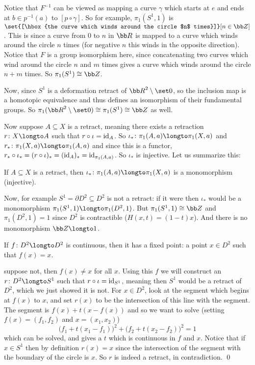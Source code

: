 Notice that $F^{-1}$ can be viewed as mapping a curve $\gamma$ which starts at $e$ and ends at $b\in p^{-1}(a)$ to $[p\circ\gamma]$.
So for example, $\pi_1(S^1,1)$ is $\set{[\hbox{the curve which winds around the circle $n$ times}]}[n\in{\bb Z}]$.
This is since a curve from $0$ to $n$ in ${\bb R}$ is mapped to a curve which winds around the circle $n$ times (for negative $n$ this winds in the opposite direction).
Notice that $F$ is a group isomorphism here, since concatenating two curves which wind around the circle $n$ and $m$ times gives a curve which winds around the circle $n+m$ times.
So $\pi_1(S^1)\cong{\bb Z}$.

Now, since $S^1$ is a deformation retract of ${\bb R}^2\setminus\set0$, so the inclusion map is a homotopic equivalence and thus defines an isomorphism of their fundamental groups.
So $\pi_1({\bb R}^2\setminus\set0)\cong\pi_1(S^1)\cong{\bb Z}$ as well.

Now suppose $A\subseteq X$ is a retract, meaning there exists a retraction $r\colon X\longto A$ such that $r\circ\iota={\rm id}_A$.
So $\iota_*\colon\pi_1(A,a)\longto\pi_1(X,a)$ and $r_*\colon\pi_1(X,a)\longto\pi_1(A,a)$ and since this is a functor, $r_*\circ\iota_*=(r\circ\iota)_*=({\rm id}_A)_*={\rm id}_{\pi_1(A,a)}$.
So $\iota_*$ is injective.
Let us summarize this:

\bprop

    If $A\subseteq X$ is a retract, then $\iota_*\colon\pi_1(A,a)\longto\pi_1(X,a)$ is a monomorphism (injective).

\eprop

Now, for example $S^1=\partial D^2\subseteq D^2$ is not a retract: if it were then $\iota_*$ would be a monomorphism $\pi_1(S^1,1)\longto\pi_1(D^2,1)$.
But $\pi_1(S^1,1)\cong{\bb Z}$ and $\pi_1(D^2,1)=1$ since $D^2$ is contractible ($H(x,t)=(1-t)x$).
And there is no monomorphism ${\bb Z}\longto1$.

\bthrm[title=Brouwer Fixed-Point Theorem (for $D^2$), name=fpthrm]

    If $f\colon D^2\longto D^2$ is continuous, then it has a fixed point: a point $x\in D^2$ such that $f(x)=x$.

\ethrm

\Proof suppose not, then $f(x)\neq x$ for all $x$.
Using this $f$ we will construct an $r\colon D^2\longto S^1$ such that $r\circ\iota={\rm id}_{S^1}$, meaning then $S^1$ would be a retract of $D^2$, which we just showed it is not.
For $x\in D^2$, look at the segment which begins at $f(x)$ to $x$, and set $r(x)$ to be the intersection of this line with the segment.
The segment is $f(x)+t(x-f(x))$ and so we want to solve (setting $f(x)=(f_1,f_2)$ and $x=(x_1,x_2)$)
$$ \bigl(f_1+t(x_1-f_1)\bigr)^2 + \bigl(f_2+t(x_2-f_2)\bigr)^2 = 1 $$
which can be solved, and gives a $t$ which is continuous in $f$ and $x$.
Notice that if $x\in S^1$ then by definition $r(x)=x$ since the intersection of the segment with the boundary of the circle is $x$.
So $r$ is indeed a retract, in contradiction.
\qed


